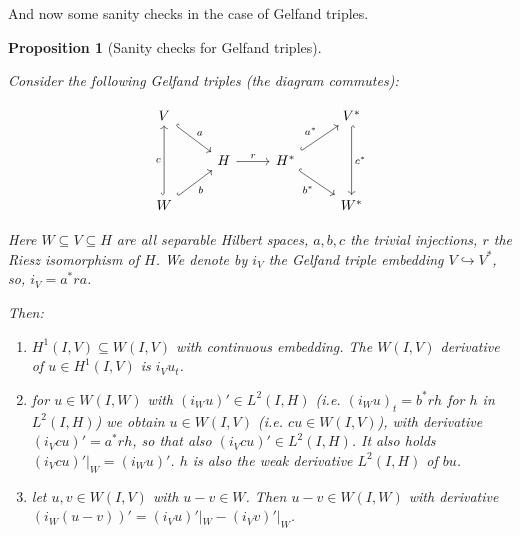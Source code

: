 \documentclass[english,a4paper,10pt,oneside]{scrbook}	%
\theoremstyle{break}
\newtheorem{prop}[equation]{Proposition}
\theoremstyle{remark}
\newcommand{\emb}{\hookrightarrow}
\begin{document}
And now some sanity checks in the case of Gelfand triples. 

\begin{prop}[Sanity checks for Gelfand triples]
\label{prop:sanity}

Consider the following Gelfand triples (the diagram commutes):

\[\begin{tikzcd}
	{V} &&& {V^*} \\
	& H & {H^*} \\
	{W} &&& {W^*}
	\arrow["c", hook, from=3-1, to=1-1]
	\arrow["a", hook, from=1-1, to=2-2]
	\arrow["b"', hook, from=3-1, to=2-2]
	\arrow["{a^*}", hook, from=2-3, to=1-4]
	\arrow["r", from=2-2, to=2-3]
	\arrow["{b^*}"', hook, from=2-3, to=3-4]
	\arrow["{c^*}", hook, from=1-4, to=3-4]
\end{tikzcd}\]

Here $W\subseteq V \subseteq H$ are all separable Hilbert spaces, $a,b,c$ the trivial injections, $r$ the Riesz isomorphism of $H$. We denote by $i_V$ the Gelfand triple embedding $V\emb V^*$, so, $i_V=a^*ra$.

Then:

\begin{enumerate}
	\item $H^1(I,V)\subseteq W(I,V)$ with continuous embedding. The $W(I,V)$ derivative of $u \in H^1(I,V)$ is $i_V u_t$.
	\item for $u \in W(I,W)$ with $(i_W u)'\in L^2(I,H)$ (i.e. $(i_W u)_t = b^*r h$ for $h$ in $L^2(I,H)$) we obtain $u \in W(I,V)$ (i.e. $cu \in W(I,V)$), with derivative $(i_V cu)'=a^*r h$, so that also $(i_V cu)' \in L^2(I,H)$. It also holds $(i_V cu)'|_W = (i_W u)'$. $h$ is also the weak derivative $L^2(I,H)$ of $bu$.
	\item let $u, v \in W(I,V)$ with $u-v \in W$. Then $u-v \in W(I,W)$ with derivative $(i_W(u-v))'=(i_V u)'|_W-(i_V v)'|_W$.
\end{enumerate}

\end{prop}
\end{document}
